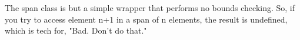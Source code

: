 \begin{tcolorbox}[colback=webgreen!5!white,colframe=webgreen!75!black,title=Important Note]
The span class is but a simple wrapper that performs no bounds checking. So, if you try to access element n+1 in a span of n elements, the result is undefined, which is tech for, "Bad. Don't do that."
\end{tcolorbox}

